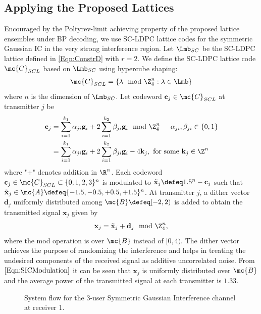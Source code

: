 \documentclass[journal]{IEEEtran}
\begin{document}
\subsection{Applying the Proposed Lattices}
Encouraged by the Poltyrev-limit achieving property of the proposed lattice ensembles under BP decoding, we use SC-LDPC lattice codes for the symmetric Gaussian IC in the very strong interference region. Let $\Lmb_{SC}$ be the SC-LDPC lattice defined in \eqref{Eqn:ConstrD} with $r=2$.
We define the SC-LDPC lattice code $\mc{C}_{SCL}$ based on $\Lmb_{SC}$ using hypercube shaping:
\begin{align}
\mc{C}_{SCL}=\left\lbrace \mathbf{\lambda} \mod \Z_{4}^{n}: \mathbf{\lambda} \in \Lmb \right\rbrace
\end{align}
where $n$ is the dimension of $\Lmb_{SC}$. Let codeword $\mathbf{c}_{j}\in\mc{C}_{SCL}$ at transmitter $j$ be
\begin{align}
\mathbf{c}_{j}&= \sum_{i=1}^{k_{1}}\alpha_{ji}\mathbf{g}_i+2\sum_{i=1}^{k_{2}}\beta_{ji}\mathbf{g}_i \mod \Z_{4}^{n}\hspace{15pt} \alpha_{ji},\beta_{ji}\in \{0,1\}\\
\label{Eqn:SICCodeword}
&= \sum_{i=1}^{k_{1}}\alpha_{ji}\mathbf{g}_i+2\sum_{i=1}^{k_{2}}\beta_{ji}\mathbf{g}_i -4\mathbf{k}_{j}, \ \mbox{for some} \ \mathbf{k}_{j}\in\Z^{n}
\end{align}
where "$+$" denotes addition in $\R^{n}$. Each codeword $\mathbf{c}_{j}\in\mc{C}_{SCL}\subset\{0,1,2,3\}^{n}$ is modulated to $\mathbf{\tilde{x}}_{j}\defeq 1.5^{n}-\mathbf{c}_{j}$ such that $\mathbf{\tilde{x}}_{j}\in\mc{A}\defeq\{-1.5,-0.5,+0.5,+1.5\}^{n}$. At transmitter $j$, a dither vector $\mathbf{d}_{j}$ uniformly distributed among $\mc{B}\defeq [-2,2)$ is added to obtain the transmitted signal $\mathbf{x}_j$ given by
\begin{align}
\mathbf{x}_{j}=\mathbf{\tilde{x}}_{j}+\mathbf{d}_{j} \mod \Z_{4}^{n},
\label{Eqn:SICdither}
\end{align}
where the mod operation is over $\mc{B}$ instead of $[0,4)$. The dither vector achieves the purpose of randomizing the interference and helps in treating the undesired components of the received signal as additive uncorrelated noise. From $\eqref{Eqn:SICModulation}$ it can be seen that $\mathbf{x}_{j}$ is uniformly distributed over $\mc{B}$ and the average power of the transmitted signal at each transmitter is $1.33$.

\begin{figure}[t]
\centering
\resizebox{0.8\textwidth}{!}{

}
\caption{System flow for the 3-user Symmetric Gaussian Interference channel at receiver 1.}
\label{Fig:SIC_decoder}
\end{figure}
\end{document}
